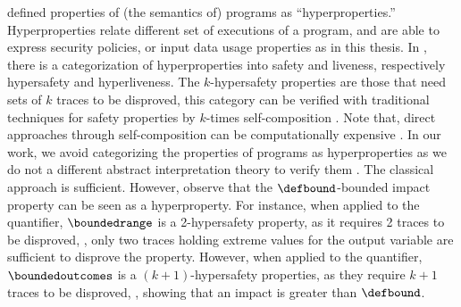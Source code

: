  defined properties of (the semantics of) programs as ``hyperproperties.''
Hyperproperties relate different set of executions of a program, and are able to express security policies, or input data usage properties as in this thesis.
In \textcite{Clarkson2010}, there is a categorization of hyperproperties into safety and liveness, respectively hypersafety and hyperliveness. The $k$-hypersafety properties are those that need sets of $k$ traces to be disproved, this category can be verified with traditional techniques for safety properties by $k$-times self-composition .
Note that, direct approaches through self-composition can be computationally expensive .
In our work, we avoid categorizing the properties of programs as hyperproperties as we do not a different abstract interpretation theory to verify them . The classical approach  is sufficient. However, observe that the $\defbound$-bounded impact property can be seen as a hyperproperty. For instance, when applied to the \rangename{} quantifier, $\boundedrange$ is a 2-hypersafety property, as it requires 2 traces to be disproved, \ie, only two traces holding extreme values for the output variable are sufficient to disprove the property. However, when applied to the \outcomesname{} quantifier, $\boundedoutcomes$ is a $(k+1)$-hypersafety properties, as they require $k+1$ traces to be disproved, \ie, showing that an impact is greater than $\defbound$.


